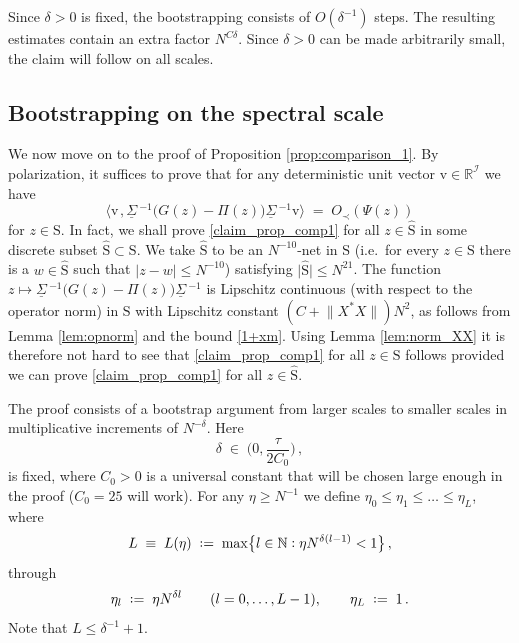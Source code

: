 \documentclass[11pt]{article} %
\numberwithin{equation}{section}
\numberwithin{figure}{section}
\theoremstyle{plain} %
\theoremstyle{definition} %
\newcommand{\f}[1]{\boldsymbol{\mathrm{#1}}} %
\renewcommand{\cal}{\mathcal}
\newcommand{\ul}[1]{\underline{#1} \!\,} %
\newcommand{\wh}{\widehat}
\newcommand{\R}{\mathbb{R}}
\newcommand{\N}{\mathbb{N}}
\newcommand{\col}{\mathrel{\vcenter{\baselineskip0.75ex \lineskiplimit0pt \hbox{.}\hbox{.}}}}
\newcommand*{\deq}{\mathrel{\vcenter{\baselineskip0.65ex \lineskiplimit0pt \hbox{.}\hbox{.}}}=}
\renewcommand{\leq}{\leqslant}
\renewcommand{\geq}{\geqslant}
\newcommand{\pb}[1]{\bigl({#1}\bigr)}
\newcommand{\pbb}[1]{\biggl({#1}\biggr)}
\newcommand{\hb}[1]{\bigl\{{#1}\bigr\}}
\newcommand{\abs}[1]{\lvert #1 \rvert}
\newcommand{\norm}[1]{\lVert #1 \rVert}
\newcommand{\scalarb}[2]{\bigl\langle{#1} \mspace{2mu}, {#2}\bigr\rangle}
\begin{document}
Since $\delta > 0$ is fixed, the bootstrapping consists of $O(\delta^{-1})$ steps. The resulting estimates contain an extra factor $N^{C \delta}$. Since $\delta > 0$ can be made arbitrarily small, the claim will follow on all scales.






\subsection{Bootstrapping on the spectral scale}

We now move on to the proof of Proposition \ref{prop:comparison_1}. By polarization, it suffices to prove that for any deterministic unit vector $\f v \in \R^{\cal I}$ we have
\begin{equation} \label{claim_prop_comp1}
\scalarb{\f v}{ \ul \Sigma^{-1} \pb{G(z) - \Pi(z)} \ul \Sigma^{-1} \f v} \;=\; O_\prec(\Psi(z))
\end{equation}
for $z \in \f S$. In fact, we shall prove \eqref{claim_prop_comp1} for all $z \in \wh{\f S}$ in some discrete subset $\wh{\f S} \subset \f S$. We take $\wh{\f S}$ to be an $N^{-10}$-net in $\f S$ (i.e.\ for every $z \in \f S$ there is a $w \in \wh{\f S}$ such that $\abs{z - w} \leq N^{-10}$) satisfying $\abs{\wh{\f S}} \leq N^{21}$. The function $z \mapsto \ul \Sigma^{-1} \pb{G(z) - \Pi(z)} \ul \Sigma^{-1}$ is Lipschitz continuous (with respect to the operator norm) in $\f S$ with Lipschitz constant $(C + \norm{X^* X}) N^2$, as follows from Lemma \ref{lem:opnorm} and the bound \eqref{1+xm}. Using Lemma \ref{lem:norm_XX} it is therefore not hard to see that \eqref{claim_prop_comp1} for all $z \in \f S$ follows provided we can prove \eqref{claim_prop_comp1} for all $z \in \wh{\f S}$.

The proof consists of a bootstrap argument from larger scales to smaller scales in multiplicative increments of $N^{-\delta}$. Here
\begin{equation} \label{cond_delta}
\delta \;\in\; \pbb{0, \frac{\tau}{2 C_0}}\,,
\end{equation}
is fixed, where $C_0 > 0$ is a universal constant that will be chosen large enough in the proof ($C_0 = 25$ will work).
For any $\eta \geq N^{-1}$ we define $\eta_0 \leq \eta_1 \leq \dots \leq \eta_L$, where
\begin{equation} \label{def_L_eta}
L \;\equiv\; L(\eta) \;\deq\; \max \hb{l \in \N \col \eta N^{\delta (l -1)} < 1}\,,
\end{equation}
through
\begin{equation} \label{def_eta_k}
\eta_l \;\deq\; \eta N^{\delta l} \qquad (l = 0, \dots, L - 1), \qquad \eta_L \;\deq\; 1\,.
\end{equation}
Note that $L \leq \delta^{-1} + 1$.
\end{document}
